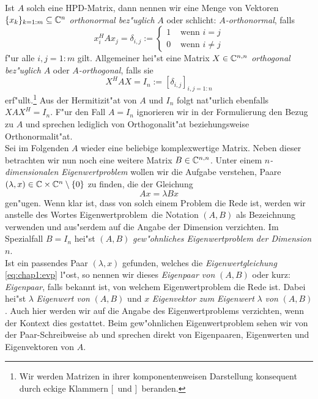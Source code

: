Ist $A$ solch eine HPD-Matrix,
dann nennen wir eine Menge von Vektoren $\{x_k\}_{k=1:m}\subseteq\mathbb{C}^n$ \emph{orthonormal
bez"uglich} $A$ oder schlicht: \emph{$A$-orthonormal}, falls
\[
x_i^H A x_j = \delta_{i,j} := \begin{cases}
1 & \text{ wenn } i=j \\
0 & \text{ wenn } i\neq j
\end{cases}
\]
f"ur alle $i,j = 1:m$ gilt. Allgemeiner hei"st eine Matrix $X\in\mathbb{C}^{n,n}$ \emph{orthogonal bez"uglich} $A$ oder \emph{$A$-orthogonal}, falls sie
\[
X^H A X = I_n := [\delta_{i,j}]_{i,j=1:n}
\]
erf"ullt.\footnote{Wir werden Matrizen in ihrer komponentenweisen Darstellung konsequent durch eckige Klammern \glqq$[$\grqq\ und \glqq$]$\grqq\ beranden.} Aus der Hermitizit"at von $A$ und $I_n$ folgt nat"urlich ebenfalls $XAX^H = I_n$. F"ur den Fall $A=I_n$ ignorieren wir in der Formulierung den Bezug zu $A$ und sprechen lediglich von Orthogonalit"at beziehungsweise Orthonormalit"at.\\

Sei im Folgenden $A$ wieder eine beliebige komplexwertige Matrix. Neben dieser betrachten wir nun noch eine weitere Matrix $B\in\mathbb{C}^{n,n}$.
Unter einem \emph{$n$-dimensionalen Eigenwertproblem} wollen wir die Aufgabe verstehen, Paare $(\lambda,x)\in\mathbb{C}\times\mathbb{C}^n \setminus\{0\}$ zu finden, die der Gleichung
\begin{equation}\label{eq:chap1:evp}
Ax = \lambda Bx
\end{equation}
gen"ugen. Wenn klar ist, dass von solch einem Problem die Rede ist, werden wir anstelle des Wortes \glqq Eigenwertproblem\grqq\ die Notation $(A,B)$ als Bezeichnung verwenden und aus"serdem auf die Angabe der Dimension verzichten. Im Spezialfall $B=I_n$
hei"st $(A,B)$ \emph{gew"ohnliches Eigenwertproblem der Dimension $n$}.\\

Ist ein passendes Paar $(\lambda,x)$ gefunden, welches die \emph{Eigenwertgleichung} \eqref{eq:chap1:evp} l"ost, so nennen wir dieses \emph{Eigenpaar von} $(A,B)$ oder kurz: \emph{Eigenpaar}, falls bekannt ist, von welchem Eigenwertproblem die Rede ist.
Dabei hei"st $\lambda$ \emph{Eigenwert von} $(A,B)$ und $x$ \emph{Eigenvektor zum Eigenwert} $\lambda$ \emph{von} $(A,B)$. Auch hier werden wir auf die Angabe des Eigenwertproblems verzichten, wenn der Kontext dies gestattet.
Beim gew"ohnlichen Eigenwertproblem sehen wir von der Paar-Schreibweise ab und sprechen direkt von Eigenpaaren, Eigenwerten und Eigenvektoren von $A$.\\

